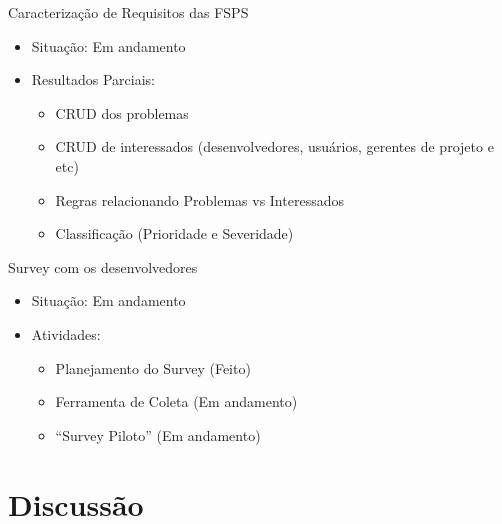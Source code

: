 \documentclass[t,14pt,mathserif]{beamer}
\begin{document}
\begin{frame}{Caracterização de Requisitos das FSPS}
		\begin{itemize}
			\item Situação: Em andamento
			\item Resultados Parciais:
				\begin{itemize}
					 \item CRUD dos problemas
                     \item CRUD de interessados (desenvolvedores, usuários,
                         gerentes de projeto e etc)
					 \item Regras relacionando Problemas vs Interessados
		             \item Classificação (Prioridade e Severidade)
				\end{itemize}
	    \end{itemize}
\end{frame}

\begin{frame}{Survey com os desenvolvedores}
		\begin{itemize}
			\item Situação: Em andamento
			\item Atividades:
			\begin{itemize}
				\item Planejamento do Survey (Feito)
				\item Ferramenta de Coleta (Em andamento)
				\item ``Survey Piloto'' (Em andamento)
			\end{itemize}
		\end{itemize}
\end{frame}

\section{Discussão}

\end{document}
